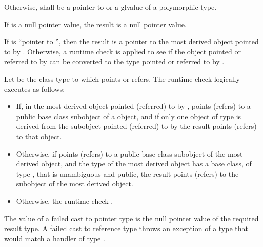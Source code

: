 \pnum
Otherwise,  shall be a pointer to or a glvalue of a polymorphic
type.

\pnum
If  is a null pointer value, the result is a null pointer value.

\pnum
If  is ``pointer to \cv{} '', then the result
is a pointer to the most derived object pointed to by .
Otherwise, a runtime check is applied to see if the object pointed or
referred to by  can be converted to the type pointed or
referred to by .

\pnum
Let  be the class type to which  points or refers. The runtime
check logically executes as follows:

\begin{itemize}
\item If, in the most derived object pointed (referred) to by ,
 points (refers) to a public base class subobject of a
 object, and if only one object of type  is derived
from the subobject pointed (referred) to by  the result points (refers) to that  object.

\item Otherwise, if  points (refers) to a public base
class subobject of the most derived object, and the type of the most
derived object has a base class, of type , that is unambiguous
and public, the result points (refers) to the
 subobject of the most derived object.

\item Otherwise, the
runtime check .
\end{itemize}

\pnum
The value of a failed cast to pointer type is the null pointer value of
the required result type. A failed cast to reference type throws
an exception of a type that would match a
handler of type .

